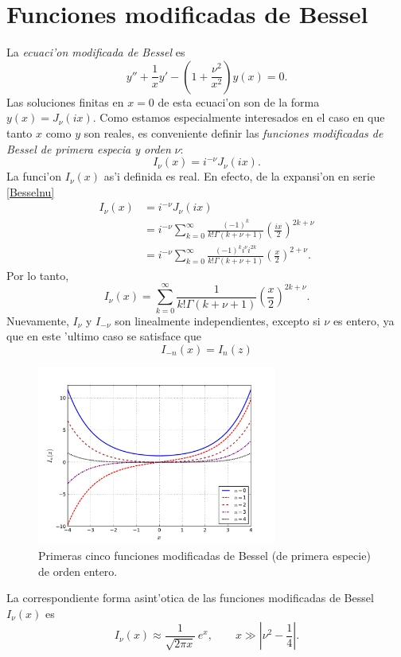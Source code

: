 \section{Funciones modificadas de Bessel}
La \textit{ecuaci'on modificada de Bessel} es 
\begin{equation} 
y'' + \frac{1}{x}y' -\left(1+\frac{\nu^2}{x^2}\right)y(x) = 0. 
\end{equation}
Las soluciones finitas en $x=0$ de esta ecuaci'on son de la forma $y(x)=J_\nu(ix)$. Como estamos especialmente interesados en el caso en que tanto $x$ como $y$ son reales, es conveniente  definir las \textit{funciones modificadas de Bessel de primera especia y orden} $\nu$:
\begin{equation}\label{defInu}
I_\nu(x) = i^{-\nu} J_\nu(ix). 
\end{equation}
La funci'on $I_\nu(x)$ as'i definida es real. En efecto, de la expansi'on en serie \eqref{Besselnu}
\begin{align}
  I_\nu(x) &= i^{-\nu} J_\nu(ix)   \\
  &= i^{-\nu}\sum_{k=0}^\infty\frac{(-1)^k}{k!\Gamma(k+\nu+1)}
  \left(\frac{ix}{2}\right)^{2k+\nu} \\
  &= i^{-\nu} \sum_{k=0}^\infty \frac{(-1)^k i^\nu i^{2k}}{k!\Gamma(k+\nu+1)} 
  \left(\frac{x}{2}\right)^{2+\nu}.
\end{align}
Por lo tanto,
\begin{equation}
\boxed{I_\nu(x) = \sum_{k=0}^\infty\frac{1}{k!\Gamma(k+\nu+ 1)}
  \left(\frac{x}{2}\right)^{2k+\nu}.}
\end{equation}
Nuevamente, $I_\nu$ y $I_{-\nu}$ son linealmente independientes, excepto si $\nu$ es entero, ya que en este 'ultimo caso se satisface que
\begin{equation}
I_{-n}(x)=I_n(z)
\end{equation}
\begin{figure}[H]
\centering
\includegraphics[angle=0,width=0.7\textwidth]{figs/fig-Bessel-I.pdf}
\caption{Primeras cinco funciones modificadas de Bessel (de primera especie) de orden entero.}
\label{fig-In}
\end{figure}
La correspondiente forma asint'otica de las funciones modificadas de Bessel $I_\nu(x)$ es
\begin{equation}
I_\nu(x) \approx \frac{1}{\sqrt{2\pi x}}\,e^x, \qquad x\gg\left|\nu^2-\frac{1}{4}\right|.
\end{equation}

